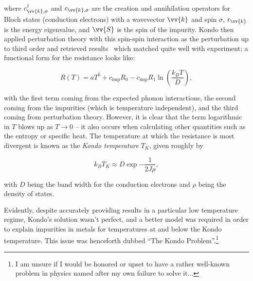 where $c_{\vv{k},\sigma}^\dagger$ and $c_{\vv{k},\sigma}$ are the creation and annihilation operators for Bloch states (conduction electrons) with a wavevector $\vv{k}$ and spin $\sigma$, $\epsilon_{\vv{k}}$ is the energy eigenvalue, and $\vv{S}$ is the spin of the impurity. Kondo then applied perturbation theory with this spin-spin interaction as the perturbation up to third order and retrieved results~\cite{Kondo_1964} which matched quite well with experiment; a functional form for the resistance looks like:

\begin{equation}
  R(T) = aT^5 + c_{\mathrm{imp}}R_0 - c_{\mathrm{imp}}R_1 \ln\left( \frac{k_B T}{D} \right),
\end{equation}

with the first term coming from the expected phonon interactions, the second coming from the impurities (which is temperature independent), and the third coming from perturbation theory. However, it is clear that the term logarithmic in $T$ blows up as $T \rightarrow 0$ -- it also occurs when calculating other quantities such as the entropy or specific heat. The temperature at which the resistance is most divergent is known as the \textit{Kondo temperature} $T_K$, given roughly by

\begin{equation}
  k_BT_K \approx D\exp{- \frac{1}{2J\rho}},
\end{equation}

with $D$ being the band width for the conduction electrons and $\rho$ being the density of states.

Evidently, despite accurately providing results in a particular low temperature regime, Kondo's solution wasn't perfect, and a better model was required in order to explain impurities in metals for temperatures at and below the Kondo temperature. This issue was henceforth dubbed ``The Kondo Problem''.\footnote{I am unsure if I would be honored or upset to have a rather well-known problem in physics named after my own failure to solve it...}

